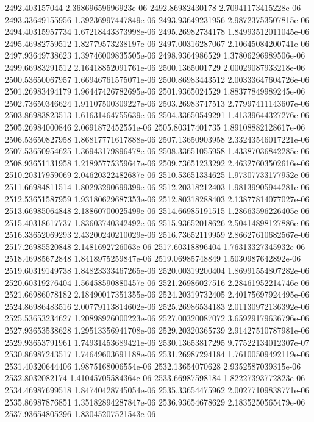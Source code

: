 {2492.403157044 2.36869659696923e-06
2492.86982430178 2.70941173415228e-06
2493.33649155956 1.39236997447849e-06
2493.93649231956 2.98723753507815e-06
2494.40315957734 1.67218443373998e-06
2495.26982734178 1.84993512011045e-06
2495.46982759512 1.82779573238197e-06
2497.00316287067 2.10645084200741e-06
2497.93649738623 1.39746009835505e-06
2498.9364986529 1.37806296989506e-06
2499.66983291512 2.16418852091761e-06
2500.1365001729 2.00029087933218e-06
2500.53650067957 1.66946761575071e-06
2500.86983443512 2.00333647604726e-06
2501.26983494179 1.96447426782695e-06
2501.9365024529 1.88377849989245e-06
2502.73650346624 1.91107500309227e-06
2503.26983747513 2.77997411143607e-06
2503.86983823513 1.61631464755639e-06
2504.33650549291 1.41339644327276e-06
2505.26984000846 2.0691872452551e-06
2505.80317401735 1.89108882128617e-06
2506.53650827958 1.86817771617888e-06
2507.13650903958 2.33243546017221e-06
2507.53650954625 1.36943179896478e-06
2508.33651055958 1.43387036842285e-06
2508.93651131958 1.21895775359647e-06
2509.73651233292 2.46327603502616e-06
2510.20317959069 2.04620322482687e-06
2510.53651334625 1.97307733177952e-06
2511.66984811514 1.80293290699399e-06
2512.20318212403 1.98139905944281e-06
2512.53651587959 1.93180629687353e-06
2512.80318288403 2.13877814077027e-06
2513.66985064848 2.18860700025499e-06
2514.66985191515 1.28663596226405e-06
2515.40318617737 1.83603740342492e-06
2515.93652018626 2.50414898127886e-06
2516.33652069293 2.43200240210029e-06
2516.73652119959 2.86627610682567e-06
2517.26985520848 2.1481692726063e-06
2517.60318896404 1.76313327345932e-06
2518.46985672848 1.8418975259847e-06
2519.06985748849 1.5030987642892e-06
2519.60319149738 1.84823333467265e-06
2520.00319200404 1.86991554807282e-06
2520.60319276404 1.56458590880457e-06
2521.26986027516 2.28461952214746e-06
2521.66986078182 2.18490017351355e-06
2524.20319732405 2.40175697924495e-06
2524.86986483516 2.00779113814602e-06
2525.26986534183 2.01130972136392e-06
2525.53653234627 1.20898926000223e-06
2527.00320087072 3.65929179636796e-06
2527.93653538628 1.29513356941708e-06
2529.20320365739 2.91427510787981e-06
2529.93653791961 1.74931453689421e-06
2530.13653817295 9.77522134012307e-07
2530.86987243517 1.74649603691188e-06
2531.26987294184 1.76100509492119e-06
2531.40320644406 1.9875168006554e-06
2532.13654070628 2.9352587039315e-06
2532.8032082174 1.41045705584364e-06
2533.66987598184 1.82227393772823e-06
2534.46987699518 1.84740428745054e-06
2535.33654475962 2.00277109838771e-06
2535.86987876851 1.35182894287847e-06
2536.93654678629 2.1835250565479e-06
2537.93654805296 1.83045207521543e-06
}
